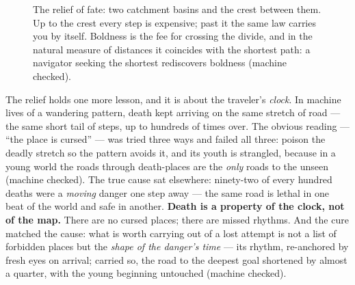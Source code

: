 \documentclass[11pt,letterpaper]{article}
\begin{document}
\begin{figure}[H]
\centering
{}
\caption{The relief of fate: two catchment basins and the crest
between them. Up to the crest every step is expensive; past it the
same law carries you by itself. Boldness is the fee for crossing the
divide, and in the natural measure of distances it coincides with the
shortest path: a navigator seeking the shortest rediscovers boldness
(machine checked).}
\label{fig:golden}
\end{figure}

The relief holds one more lesson, and it is about the traveler's
\emph{clock}. In machine lives of a wandering pattern, death kept
arriving on the same stretch of road --- the same short tail of
steps, up to hundreds of times over. The obvious reading --- ``the
place is cursed'' --- was tried three ways and failed all three:
poison the deadly stretch so the pattern avoids it, and its youth
is strangled, because in a young world the roads through
death-places are the \emph{only} roads to the unseen (machine
checked). The true cause sat elsewhere: ninety-two of every hundred
deaths were a \emph{moving} danger one step away --- the same road
is lethal in one beat of the world and safe in another.
\textbf{Death is a property of the clock, not of the map.} There
are no cursed places; there are missed rhythms. And the cure
matched the cause: what is worth carrying out of a lost attempt is
not a list of forbidden places but the \emph{shape of the danger's
time} --- its rhythm, re-anchored by fresh eyes on arrival; carried
so, the road to the deepest goal shortened by almost a quarter,
with the young beginning untouched (machine checked).
\end{document}
